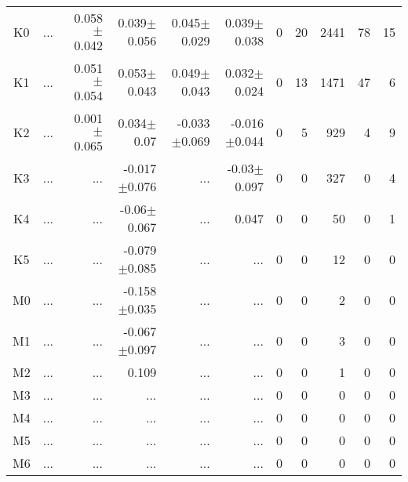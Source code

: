 \begin{table}[t]
\begin{center}
\begin{tabular}{c|rrrrr|rrrrr}
K0	&	 ...	&	0.058$\pm$0.042	&	0.039$\pm$0.056	&	0.045$\pm$0.029	&	0.039$\pm$0.038	&	0	&	20	&	2441	&	78	&	15	\\
K1	&	 ...	&	0.051$\pm$0.054	&	0.053$\pm$0.043	&	0.049$\pm$0.043	&	0.032$\pm$0.024	&	0	&	13	&	1471	&	47	&	6	\\
K2	&	 ...	&	0.001$\pm$0.065	&	0.034$\pm$0.07	&	-0.033$\pm$0.069	&	-0.016$\pm$0.044	&	0	&	5	&	929	&	4	&	9	\\
K3	&	 ...	&	 ...	&	-0.017$\pm$0.076	&	 ...	&	-0.03$\pm$0.097	&	0	&	0	&	327	&	0	&	4	\\
K4	&	 ...	&	 ...	&	-0.06$\pm$0.067	&	 ...	&	0.047	&	0	&	0	&	50	&	0	&	1	\\
K5	&	 ...	&	 ...	&	-0.079$\pm$0.085	&	 ...	&	 ...	&	0	&	0	&	12	&	0	&	0	\\
M0	&	 ...	&	 ...	&	-0.158$\pm$0.035	&	 ...	&	 ...	&	0	&	0	&	2	&	0	&	0	\\
M1	&	 ...	&	 ...	&	-0.067$\pm$0.097	&	 ...	&	 ...	&	0	&	0	&	3	&	0	&	0	\\
M2	&	 ...	&	 ...	&	0.109	&	 ...	&	 ...	&	0	&	0	&	1	&	0	&	0	\\
M3	&	 ...	&	 ...	&	 ...	&	 ...	&	 ...	&	0	&	0	&	0	&	0	&	0	\\
M4	&	 ...	&	 ...	&	 ...	&	 ...	&	 ...	&	0	&	0	&	0	&	0	&	0	\\
M5	&	 ...	&	 ...	&	 ...	&	 ...	&	 ...	&	0	&	0	&	0	&	0	&	0	\\
M6	&	 ...	&	 ...	&	 ...	&	 ...	&	 ...	&	0	&	0	&	0	&	0	&	0	\\
    \bottomrule
    \end{tabular}
\end{center}
\end{table}


